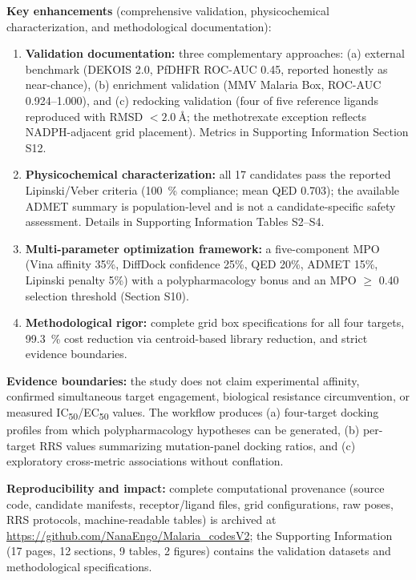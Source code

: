 \documentclass[9pt,letterpaper]{article}
\begin{document}
\noindent\textbf{Key enhancements} (comprehensive validation, physicochemical characterization, and methodological documentation):

\begin{enumerate}
\item \textbf{Validation documentation:} three complementary approaches: (a) external benchmark (DEKOIS 2.0, PfDHFR ROC-AUC \num{0.45}, reported honestly as near-chance), (b) enrichment validation (MMV Malaria Box, ROC-AUC \numrange{0.924}{1.000}), and (c) redocking validation (four of five reference ligands reproduced with RMSD $< \SI{2.0}{\angstrom}$; the methotrexate exception reflects NADPH-adjacent grid placement). Metrics in Supporting Information Section S12.

\item \textbf{Physicochemical characterization:} all 17 candidates pass the reported Lipinski/Veber criteria (\qty{100}{\percent} compliance; mean QED \num{0.703}); the available ADMET summary is population-level and is not a candidate-specific safety assessment. Details in Supporting Information Tables S2--S4.

\item \textbf{Multi-parameter optimization framework:} a five-component MPO (Vina affinity 35\%, DiffDock confidence 25\%, QED 20\%, ADMET 15\%, Lipinski penalty 5\%) with a polypharmacology bonus and an MPO $\geq$ 0.40 selection threshold (Section S10).

\item \textbf{Methodological rigor:} complete grid box specifications for all four targets, \qty{99.3}{\percent} cost reduction via centroid-based library reduction, and strict evidence boundaries.
\end{enumerate}

\noindent\textbf{Evidence boundaries:} the study does not claim experimental affinity, confirmed simultaneous target engagement, biological resistance circumvention, or measured IC\textsubscript{50}/EC\textsubscript{50} values. The workflow produces (a) four-target docking profiles from which polypharmacology hypotheses can be generated, (b) per-target RRS values summarizing mutation-panel docking ratios, and (c) exploratory cross-metric associations without conflation.

\noindent\textbf{Reproducibility and impact:} complete computational provenance (source code, candidate manifests, receptor/ligand files, grid configurations, raw poses, RRS protocols, machine-readable tables) is archived at \url{https://github.com/NanaEngo/Malaria_codesV2}; the Supporting Information (\num{17} pages, \num{12} sections, \num{9} tables, \num{2} figures) contains the validation datasets and methodological specifications.
\end{document}
